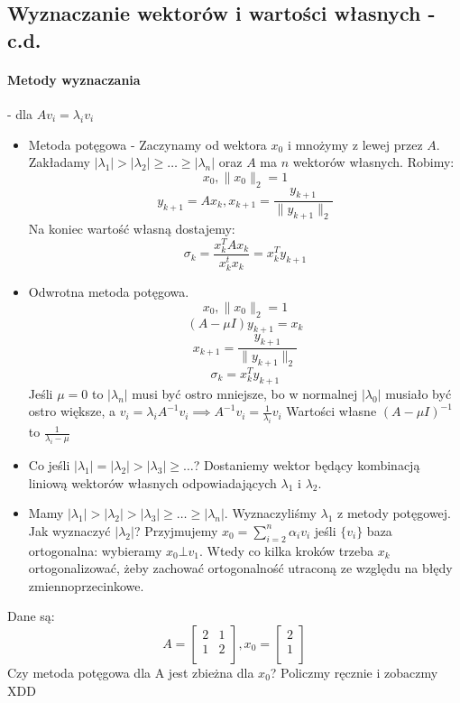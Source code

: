 \documentclass{article}
\begin{document}
\subsection{Wyznaczanie wektorów i wartości własnych - c.d.}
\paragraph{Metody wyznaczania} - dla $ Av_i=\lambda_iv_i $

\begin{itemize}
	\item Metoda potęgowa - Zaczynamy od wektora $x_0$ i mnożymy z lewej przez $ A $. Zakładamy $|\lambda_1|>|\lambda_2|\ge\ldots\ge|\lambda_n| $ oraz $ A $ ma $ n $ wektorów własnych. Robimy: $$ x_0, \|x_0\|_2=1 $$ 
	$$y_{k+1}=Ax_k, x_{k+1}=\frac{y_{k+1}}{\|y_{k+1}\|_2}$$
	Na koniec wartość własną dostajemy: 
	$$\sigma_k=\frac{x_k^TAx_k}{x_k^tx_k}=x^T_ky_{k+1} $$
	\item Odwrotna metoda potęgowa. 
	$$ x_0, \|x_0\|_2=1 $$ 
	$$(A-\mu I)y_{k+1}=x_k$$
	$$x_{k+1}=\frac{y_{k+1}}{\|y_{k+1}\|_2}$$
	$$\sigma_k=x^T_ky_{k+1} $$
	Jeśli $ \mu=0 $ to $ |\lambda_n| $ musi być ostro mniejsze, bo w normalnej $ |\lambda_0| $ musiało być ostro większe, a $ v_i=\lambda_iA^{-1}v_i\implies A^{-1}v_i=\frac1{\lambda_i}v_i$
	Wartości własne $ (A-\mu I)^{-1} $ to $ \frac{1}{\lambda_i-\mu} $
	\item Co jeśli $|\lambda_1|=|\lambda_2|>|\lambda_3|\ge \dots$? Dostaniemy wektor będący kombinacją liniową wektorów własnych odpowiadających $ \lambda_1 $ i $ \lambda_2 $.
	\item Mamy $|\lambda_1|>|\lambda_2|>|\lambda_3|\ge\ldots\ge|\lambda_n| $. Wyznaczyliśmy $ \lambda_1 $ z metody potęgowej. Jak wyznaczyć $|\lambda_2|$?
	Przyjmujemy $ x_0=\sum_{i=2}^{n}\alpha_iv_i $ jeśli $\{v_i\}  $ baza ortogonalna: wybieramy $ x_0\bot v_1 $. Wtedy co kilka  kroków trzeba $ x_k $ ortogonalizować, żeby zachować ortogonalność utraconą ze względu na błędy zmiennoprzecinkowe.
\end{itemize}
Dane są:
$$A=\begin{bmatrix}
2&1\\
1&2\\
\end{bmatrix}, x_0=\begin{bmatrix}
2\\
1\\
\end{bmatrix}$$ Czy metoda potęgowa dla A jest zbieżna dla $ x_0 $? Policzmy ręcznie i zobaczmy XDD\\
\end{document}
